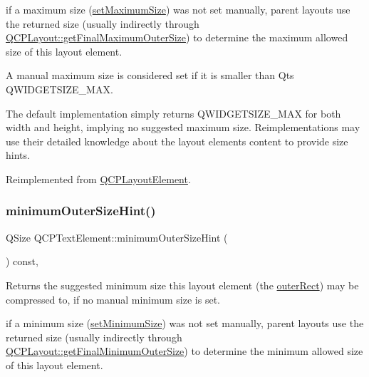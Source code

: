 if a maximum size (\mbox{\hyperlink{class_q_c_p_layout_element_a74eb5280a737ab44833d506db65efd95}{set\+Maximum\+Size}}) was not set manually, parent layouts use the returned size (usually indirectly through \mbox{\hyperlink{class_q_c_p_layout_add49fd6843821a6126914b837ed52e22}{Q\+C\+P\+Layout\+::get\+Final\+Maximum\+Outer\+Size}}) to determine the maximum allowed size of this layout element.

A manual maximum size is considered set if it is smaller than Qt\textquotesingle{}s {\ttfamily Q\+W\+I\+D\+G\+E\+T\+S\+I\+Z\+E\+\_\+\+M\+AX}.

The default implementation simply returns {\ttfamily Q\+W\+I\+D\+G\+E\+T\+S\+I\+Z\+E\+\_\+\+M\+AX} for both width and height, implying no suggested maximum size. Reimplementations may use their detailed knowledge about the layout element\textquotesingle{}s content to provide size hints. 

Reimplemented from \mbox{\hyperlink{class_q_c_p_layout_element_ad96efb977a26e360e8a64a4c1e56456d}{Q\+C\+P\+Layout\+Element}}.

\mbox{\label{class_q_c_p_text_element_a47b8541f55ff520c557e0f27461f109e}} 
\subsubsection{\texorpdfstring{minimumOuterSizeHint()}{minimumOuterSizeHint()}}
{\footnotesize\ttfamily Q\+Size Q\+C\+P\+Text\+Element\+::minimum\+Outer\+Size\+Hint (\begin{DoxyParamCaption}{ }\end{DoxyParamCaption}) const\hspace{0.3cm}{\ttfamily [protected]}, {\ttfamily [virtual]}}

Returns the suggested minimum size this layout element (the \mbox{\hyperlink{class_q_c_p_layout_element_a2a32a12a6161c9dffbadeb9cc585510c}{outer\+Rect}}) may be compressed to, if no manual minimum size is set.

if a minimum size (\mbox{\hyperlink{class_q_c_p_layout_element_a5dd29a3c8bc88440c97c06b67be7886b}{set\+Minimum\+Size}}) was not set manually, parent layouts use the returned size (usually indirectly through \mbox{\hyperlink{class_q_c_p_layout_a864fddc84721f186663faf3683f1fa70}{Q\+C\+P\+Layout\+::get\+Final\+Minimum\+Outer\+Size}}) to determine the minimum allowed size of this layout element.

